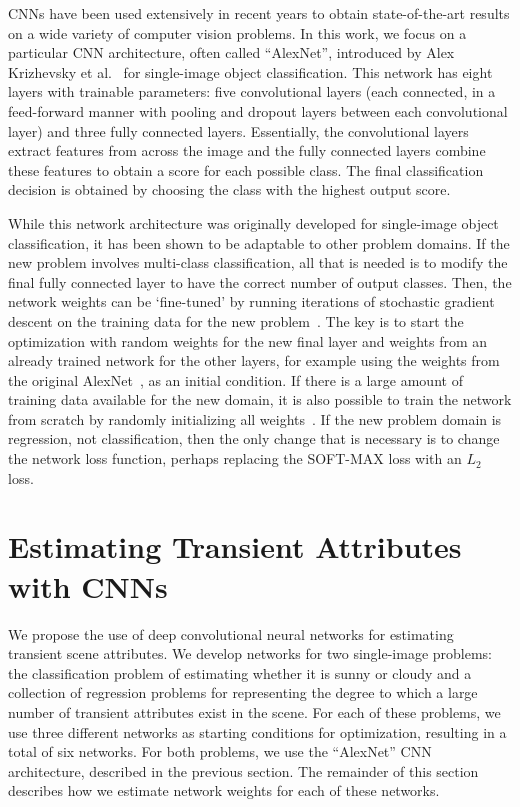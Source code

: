 \documentclass[10pt,twocolumn,letterpaper]{article}
\begin{document}
CNNs have been used extensively in recent
years to obtain state-of-the-art results on a wide variety of computer vision
problems.  In this work, we focus on a particular CNN architecture, often
called ``AlexNet'', introduced by Alex Krizhevsky et al.~\cite{caffenetnips12}
for single-image object classification. This network has eight layers with
trainable parameters: five convolutional layers (each connected, in a
feed-forward manner with pooling and dropout layers between each convolutional
layer) and three fully connected layers. Essentially, the convolutional layers
extract features from across the image and the fully connected layers combine
these features to obtain a score for each possible class. The final
classification decision is obtained by choosing the class with the highest
output score.

While this network architecture was originally developed for single-image
object classification, it has been shown to be adaptable to other problem
domains. If the new problem involves multi-class classification, all that is
needed is to modify the final fully connected layer to have the correct number
of output classes. Then, the network weights can be `fine-tuned' by running
iterations of stochastic gradient descent on the training data for the new
problem~\cite{yosinski2014transferable}.  The key is to start the optimization
with random weights for the new final layer and weights from an already trained
network for the other layers, for example using the weights from the original
AlexNet~\cite{caffenetnips12}, as an initial condition. If there is a large
amount of training data available for the new domain, it is also possible to
train the network from scratch by randomly initializing all
weights~\cite{zhou2014places}.  If the new problem domain is regression, not
classification, then the only change that is necessary is to change the network
loss function, perhaps replacing the SOFT-MAX loss with an $L_2$ loss.

\section{Estimating Transient Attributes with CNNs}
We propose the use of deep convolutional neural networks for estimating transient
scene attributes. We develop networks for two single-image problems: the
classification problem of estimating whether it is sunny or cloudy and a
collection of regression problems for representing the degree to which a large
number of transient attributes exist in the scene.  For each of these problems,
we use three different networks as starting conditions for optimization,
resulting in a total of six networks.  For both problems, we use the
``AlexNet'' CNN architecture, described in the previous section.  The remainder
of this section describes how we estimate network weights for each of these
networks.
\end{document}
